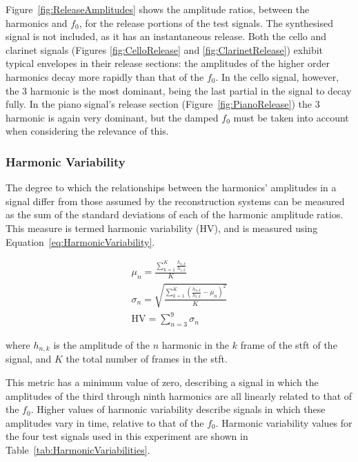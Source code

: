 			Figure~\ref{fig:ReleaseAmplitudes} shows the amplitude ratios, between the harmonics and $f_{0}$,
			for the release portions of the test signals. The synthesised signal is not included, as it has an
			instantaneous release. Both the cello and clarinet signals (Figures \ref{fig:CelloRelease} and
			\ref{fig:ClarinetRelease}) exhibit typical envelopes in their release sections: the amplitudes of
			the higher order harmonics decay more rapidly than that of the $f_{0}$. In the cello signal,
			however, the 3 harmonic is the most dominant, being the last partial in the signal to
			decay fully. In the piano signal's release section (Figure~\ref{fig:PianoRelease}) the 3
			harmonic is again very dominant, but the damped $f_{0}$ must be taken into account when considering
			the relevance of this.

		\subsubsection*{Harmonic Variability}
			The degree to which the relationships between the harmonics' amplitudes in a signal differ from
			those assumed by the reconstruction systems can be measured as the sum of the standard deviations
			of each of the harmonic amplitude ratios. This measure is termed harmonic variability
			($\mathrm{HV}$), and is measured using Equation~\ref{eq:HarmonicVariability}. 		
			
			\begin{gather}
				\mu_{n} = \frac{\sum_{k = 1}^{K} \frac{h_{n,k}}{h_{1,k}}}{K} \nonumber \\[0.6em]
				\sigma_{n} = \sqrt{\frac{\sum_{k = 1}^{K} 
							 \left(\frac{h_{n,k}}{h_{1,k}} - \mu_{n} \right)^{2}}{K}} 
							 \nonumber \\[0.6em]
				\mathrm{HV} = \sum_{n = 3}^{9} \sigma_{n}
				\label{eq:HarmonicVariability}
			\end{gather}

			where $h_{n,k}$ is the amplitude of the $n$ harmonic in the $k$ frame of the
			\acrshort{stft} of the signal, and $K$ the total number of frames in the \acrshort{stft}. 
			
			This metric has a minimum value of zero, describing a signal in which the amplitudes of the third
			through ninth harmonics are all linearly related to that of the $f_{0}$. Higher values of harmonic
			variability describe signals in which these amplitudes vary in time, relative to that of the
			$f_{0}$. Harmonic variability values for the four test signals used in this experiment are shown in
			Table~\ref{tab:HarmonicVariabilities}.

